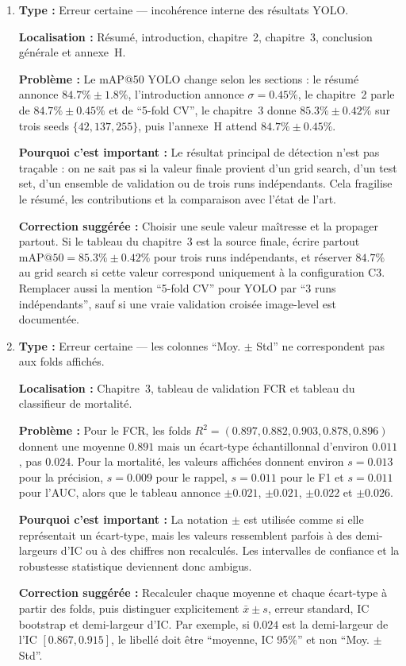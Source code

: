 \documentclass[11pt,a4paper]{article}
\newcommand{\loc}[1]{\textbf{Localisation :} #1\par}
\newcommand{\prob}[1]{\textbf{Problème :} #1\par}
\newcommand{\impact}[1]{\textbf{Pourquoi c'est important :} #1\par}
\newcommand{\fix}[1]{\textbf{Correction suggérée :} #1\par}
\newcommand{\classif}[1]{\textbf{Type :} #1\par}
\begin{document}
\begin{enumerate}
  \item \classif{Erreur certaine --- incohérence interne des résultats YOLO.}
  \loc{Résumé, introduction, chapitre~2, chapitre~3, conclusion générale et annexe~H.}
  \prob{Le mAP@50 YOLO change selon les sections : le résumé annonce \(84.7\% \pm 1.8\%\), l'introduction annonce \(\sigma=0.45\%\), le chapitre~2 parle de \(84.7\%\pm0.45\%\) et de \enquote{5-fold CV}, le chapitre~3 donne \(85.3\%\pm0.42\%\) sur trois seeds \(\{42,137,255\}\), puis l'annexe~H attend \(84.7\%\pm0.45\%\).}
  \impact{Le résultat principal de détection n'est pas traçable : on ne sait pas si la valeur finale provient d'un grid search, d'un test set, d'un ensemble de validation ou de trois runs indépendants. Cela fragilise le résumé, les contributions et la comparaison avec l'état de l'art.}
  \fix{Choisir une seule valeur maîtresse et la propager partout. Si le tableau du chapitre~3 est la source finale, écrire partout \(\mathrm{mAP@50}=85.3\%\pm0.42\%\) pour trois runs indépendants, et réserver \(84.7\%\) au grid search si cette valeur correspond uniquement à la configuration C3. Remplacer aussi la mention \enquote{5-fold CV} pour YOLO par \enquote{3 runs indépendants}, sauf si une vraie validation croisée image-level est documentée.}

  \item \classif{Erreur certaine --- les colonnes \enquote{Moy. \(\pm\) Std} ne correspondent pas aux folds affichés.}
  \loc{Chapitre~3, tableau de validation FCR et tableau du classifieur de mortalité.}
  \prob{Pour le FCR, les folds \(R^2=(0.897,0.882,0.903,0.878,0.896)\) donnent une moyenne \(0.891\) mais un écart-type échantillonnal d'environ \(0.011\), pas \(0.024\). Pour la mortalité, les valeurs affichées donnent environ \(s=0.013\) pour la précision, \(s=0.009\) pour le rappel, \(s=0.011\) pour le F1 et \(s=0.011\) pour l'AUC, alors que le tableau annonce \(\pm0.021\), \(\pm0.021\), \(\pm0.022\) et \(\pm0.026\).}
  \impact{La notation \(\pm\) est utilisée comme si elle représentait un écart-type, mais les valeurs ressemblent parfois à des demi-largeurs d'IC ou à des chiffres non recalculés. Les intervalles de confiance et la robustesse statistique deviennent donc ambigus.}
  \fix{Recalculer chaque moyenne et chaque écart-type à partir des folds, puis distinguer explicitement \(\bar{x}\pm s\), erreur standard, IC bootstrap et demi-largeur d'IC. Par exemple, si \(0.024\) est la demi-largeur de l'IC \([0.867,0.915]\), le libellé doit être \enquote{moyenne, IC 95\%} et non \enquote{Moy. \(\pm\) Std}.}


\end{enumerate}
\end{document}
